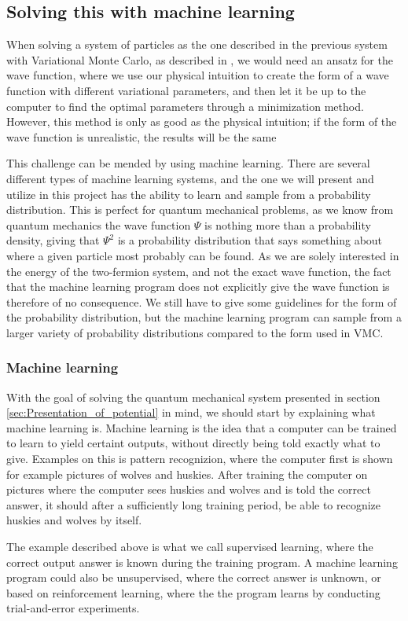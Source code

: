 \documentclass[norsk,a4paper,12pt]{article}
\begin{document}
\subsection{Solving this with machine learning}
When solving a system of particles as the one described in the previous system with Variational Monte Carlo, as described in \cite{Nordhagen}, we would need an ansatz for the wave function, where we use our physical intuition to create the form of a wave function with different variational parameters, and then let it be up to the computer to find the optimal parameters through a minimization method. However, this method is only as good as the physical intuition; if the form of the wave function is unrealistic, the results will be the same
\par 
\vspace{3mm}
This challenge can be mended by using machine learning. There are several different types of machine learning systems, and the one we will present and utilize in this project has the ability to learn and sample from a probability distribution. This is perfect for quantum mechanical problems, as we know from quantum mechanics the wave function $\Psi$ is nothing more than a probability density, giving that $\Psi^2$ is a probability distribution that says something about where a given particle most probably can be found. As we are solely interested in the energy of the two-fermion system, and not the exact wave function, the fact that the machine learning program does not explicitly give the wave function is therefore of no consequence. We still have to give some guidelines for the form of the probability distribution, but the machine learning program can sample from a larger variety of probability distributions compared to the form used in VMC.

\subsubsection{Machine learning}
With the goal of solving the quantum mechanical system presented in section \ref{sec:Presentation_of_potential} in mind, we should start by explaining what machine learning is. Machine learning is the idea that a computer can be trained to learn to yield certaint outputs, without directly being told exactly what to give. Examples on this is pattern recognizion, where the computer first is shown for example pictures of wolves and huskies. After training the computer on pictures where the computer sees huskies and wolves and is told the correct answer, it should after a sufficiently long training period, be able to recognize huskies and wolves by itself. 
\par 
\vspace{3mm}
The example described above is what we call supervised learning, where the correct output answer is known during the training program. A machine learning program could also be unsupervised, where the correct answer is unknown, or based on reinforcement learning, where the the program learns by conducting trial-and-error experiments. 
\par 
\vspace{3mm}
\end{document}
